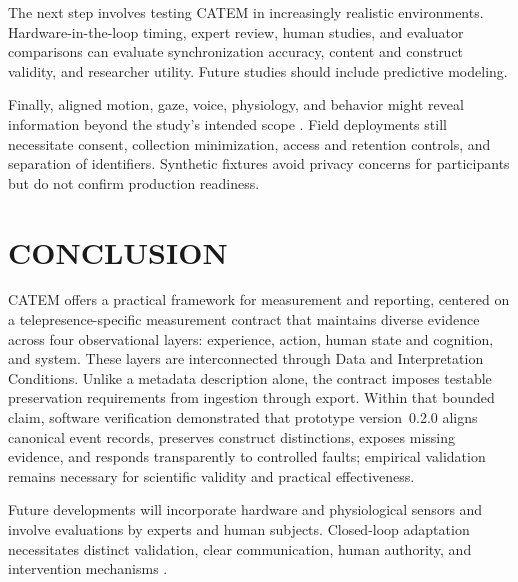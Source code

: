 \documentclass[letterpaper,10pt,conference]{ieeeconf}
\begin{document}
The next step involves testing CATEM in increasingly realistic environments. Hardware-in-the-loop timing, expert review, human studies, and evaluator comparisons can evaluate synchronization accuracy, content and construct validity, and researcher utility. Future studies should include predictive modeling.

Finally, aligned motion, gaze, voice, physiology, and behavior might reveal information beyond the study's intended scope \cite{nair2024}. Field deployments still necessitate consent, collection minimization, access and retention controls, and separation of identifiers. Synthetic fixtures avoid privacy concerns for participants but do not confirm production readiness.

\section{CONCLUSION}

CATEM offers a practical framework for measurement and reporting, centered on a telepresence-specific measurement contract that maintains diverse evidence across four observational layers: experience, action, human state and cognition, and system. These layers are interconnected through Data and Interpretation Conditions. Unlike a metadata description alone, the contract imposes testable preservation requirements from ingestion through export. Within that bounded claim, software verification demonstrated that prototype version~0.2.0 aligns canonical event records, preserves construct distinctions, exposes missing evidence, and responds transparently to controlled faults; empirical validation remains necessary for scientific validity and practical effectiveness.

Future developments will incorporate hardware and physiological sensors and involve evaluations by experts and human subjects. Closed-loop adaptation necessitates distinct validation, clear communication, human authority, and intervention mechanisms \cite{parasuraman2000,losey2018}.
\end{document}
